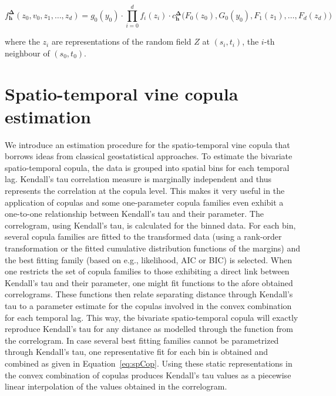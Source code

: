 \documentclass[article,nojss]{jss}
\begin{document}
\begin{equation}\label{eq:fullDensity}
f^\mathbf{\Delta}_{\mathbf{h}}(z_0, v_0, z_1, \dots, z_d) = g_0(y_0) \cdot\prod\limits_{i=0}^{d} f_i(z_i) \cdot c^\mathbf{\Delta}_{\mathbf{h}}\big(F_0(z_0), G_0(y_0), F_1(z_1), \dots, F_d(z_d)\big)
\end{equation}

where the $z_i$ are representations of the random field $Z$ at $(s_i,t_i)$, the $i$-th neighbour of $(s_0,t_0)$.

\section{Spatio-temporal vine copula estimation}
\label{sec:estimation}
We introduce an estimation procedure for the spatio-temporal vine copula that borrows ideas from classical geostatistical approaches. To estimate the bivariate spatio-temporal copula, the data is grouped into spatial bins for each temporal lag. Kendall's tau correlation measure is marginally independent and thus represents the correlation at the copula level. This makes it very useful in the application of copulas and some one-parameter copula families even exhibit a one-to-one relationship between Kendall's tau and their parameter. The correlogram, using Kendall’s tau, is calculated for the binned data. For each bin, several copula families are fitted to the transformed data (using a rank-order transformation or the fitted cumulative distribution functions of the margins) and the best fitting family (based on e.g., likelihood, AIC or BIC) is selected. When one restricts the set of copula families to those exhibiting a direct link between Kendall's tau and their parameter, one might fit functions to the afore obtained correlograms. These functions then relate separating distance through Kendall's tau to a parameter estimate for the copulas involved in the convex combination for each temporal lag. This way, the bivariate spatio-temporal copula will exactly reproduce Kendall's tau for any distance as modelled through the function from the correlogram. In case several best fitting families cannot be parametrized through Kendall's tau, one representative fit for each bin is obtained and combined as given in Equation~\ref{eq:spCop}. Using these static representations in the convex combination of copulas produces Kendall's tau values as a piecewise linear interpolation of the values obtained in the correlogram. 
\end{document}
